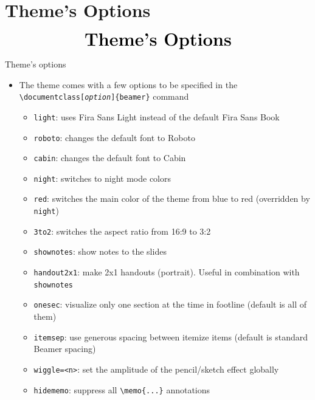 \documentclass[10pt,itemsep]{beamer}
\begin{document}
\section[Options]{Theme's Options}
\begin{frame}
    \begin{eqnarray*}
        &\text{{\huge \textbf{Theme's Options}}}\\
    \end{eqnarray*}
\end{frame}
\shownotesblock{}

\begin{frame}
    {Theme's options}
    \begin{itemize}
        \item The theme comes with a few options to be specified in the \texttt{\textbackslash documentclass[\textit{option}]\{beamer\}} command 
        \begin{itemize}
            \item \texttt{light}: uses Fira Sans Light instead of the default Fira Sans Book
            \item \texttt{roboto}: changes the default font to Roboto
            \item \texttt{cabin}: changes the default font to Cabin
            \item \texttt{night}: switches to night mode colors
            \item \texttt{red}: switches the main color of the theme from blue to red (overridden by \texttt{night})
            \item \texttt{3to2}: switches the aspect ratio from 16:9 to 3:2
            \item \texttt{shownotes}: show notes to the slides
            \item \texttt{handout2x1}: make 2x1 handouts (portrait). Useful in combination with \texttt{shownotes}
            \item \texttt{onesec}: visualize only one section at the time in footline (default is all of them)
            \item \texttt{itemsep}: use generous spacing between itemize items (default is standard Beamer spacing)
            \item \texttt{wiggle=<n>}: set the amplitude of the pencil/sketch effect globally
            \item \texttt{hidememo}: suppress all \texttt{\textbackslash memo\{...\}} annotations
        \end{itemize}
    \end{itemize}
\end{frame}
\shownotesblock{}
\end{document}
